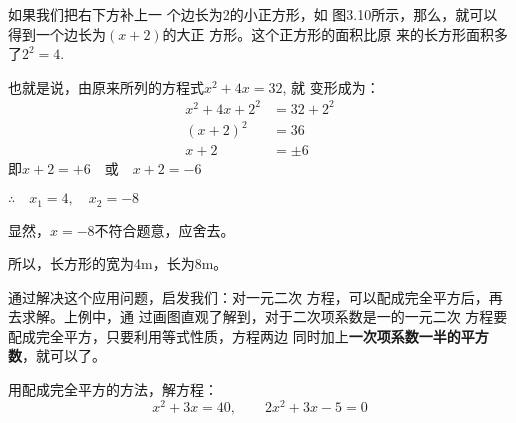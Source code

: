 如果我们把右下方补上一
个边长为2的小正方形，如
图3.10所示，那么，就可以
得到一个边长为$(x+2)$的大正
方形。这个正方形的面积比原
来的长方形面积多了$2^2=4$.
\begin{figure}[htp]
    \centering
    \caption{}
\end{figure}


也就是说，由原来所列的方程式$x^2+4x=32$, 就
变形成为：
\[\begin{split}
    x^2+4x+2^2&=32+2^2\\
    (x+2)^2&=36\\
    x+2&=\pm 6
\end{split}\]
即$x+2=+6\quad \text{或}\quad x+2=-6$

$\therefore\quad x_1=4,\quad x_2=-8$

显然，$x=-8$不符合题意，应舍去。

所以，长方形的宽为4m，长为8m。

通过解决这个应用问题，启发我们：对一元二次
方程，可以配成完全平方后，再去求解。上例中，通
过画图直观了解到，对于二次项系数是一的一元二次
方程要配成完全平方，只要利用等式性质，方程两边
同时加上\textbf{一次项系数一半的平方数}，就可以了。

\begin{example}
    用配成完全平方的方法，解方程：
\[x^2+3x=40,\qquad 2x^2+3x-5=0 \]
\end{example}


